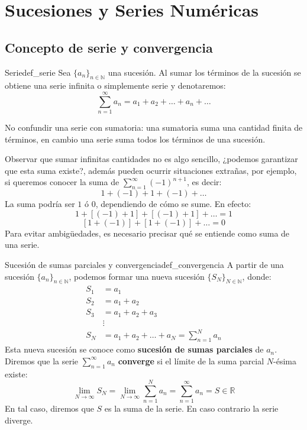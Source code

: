 \section{Sucesiones y Series Numéricas}

\subsection{Concepto de serie y convergencia}

\begin{definition}{Serie}{def_serie}
    Sea $\{a_n\}_{n\in\mathbb{N}}$ una sucesión. Al sumar los términos de la sucesión se obtiene una serie infinita o simplemente serie y denotaremos:
    \[ \sum_{n=1}^{\infty}a_n = a_1 + a_2 + \dots + a_n + \dots \]
\end{definition}

No confundir una serie con sumatoria: una sumatoria suma una cantidad finita de términos, en cambio una serie suma todos los términos de una sucesión.

Observar que sumar infinitas cantidades no es algo sencillo, ¿podemos garantizar que esta suma existe?, además pueden ocurrir situaciones extrañas, por ejemplo, si queremos conocer la suma de $\displaystyle\sum_{n=1}^{\infty}(-1)^{n+1}$, es decir:
\[ 1 + (-1) + 1 + (-1) + \dots \]
La suma podría ser $1$ ó $0$, dependiendo de cómo se sume. En efecto:
\[ 1 + [(-1) + 1] + [(-1) + 1] + \dots = 1 \]
\[ [1 + (-1)] + [1 + (-1)] + \dots = 0 \]
Para evitar ambigüedades, es necesario precisar qué se entiende como suma de una serie.

\begin{definition}{Sucesión de sumas parciales y convergencia}{def_convergencia}
    A partir de una sucesión $\{a_n\}_{n\in\mathbb{N}}$, podemos formar una nueva sucesión $\{S_N\}_{N\in\mathbb{N}}$, donde:
    \begin{align*}
        S_1 &= a_1 \\
        S_2 &= a_1 + a_2 \\
        S_3 &= a_1 + a_2 + a_3 \\
            &\vdots \\
        S_N &= a_1 + a_2 + \dots + a_N = \sum_{n=1}^{N}a_n
    \end{align*}
    Esta nueva sucesión se conoce como \textbf{sucesión de sumas parciales} de $a_n$.
    Diremos que la serie $\displaystyle\sum_{n=1}^{\infty}a_n$ \textbf{converge} si el límite de la suma parcial $N$-ésima existe:
    \[ \lim_{N\to\infty}S_N = \lim_{N\to\infty}\sum_{n=1}^{N}a_n = \sum_{n=1}^{\infty}a_n = S \in \mathbb{R} \]
    En tal caso, diremos que $S$ es la suma de la serie. En caso contrario la serie diverge.
\end{definition}

